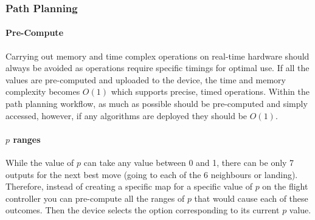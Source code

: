\subsubsection{Path Planning}\label{sub_sub_section:tgt_search}
%

\begin{comment}
\paragraph{Exhaustive Search}
The simplest algorithm is the recursive function shown in Algorithm \ref{alg:search}. There are steps taken to increase the efficiency, including pruning lines that already exceed the minimum cost as the cost is monotonic increasing and automatically terminating lines when they can land safely. However, the worst case time complexity remains $O(|V|6^{depth})$ as each node has 6 neighbours that get called recursively. To get guaranteed correct results it would require searching all paths as long as $|V|$ as costs cannot fall below 0 so it is never advantageous to revisit a node. Therefore, the worst case complexity for guaranteed optimal paths is $O(|V|6^{|V|})$. This is not usable for practical applications, therefore it requires a compromise to depth of search, no longer getting optimal path results.
\end{comment}
\paragraph{Pre-Compute}
Carrying out memory and time complex operations on real-time hardware should always be avoided as operations require specific timings for optimal use. If all the values are pre-computed and uploaded to the device, the time and memory complexity becomes $O(1)$ which supports precise, timed operations. Within the path planning workflow, as much as possible should be pre-computed and simply accessed, however, if any algorithms are deployed they should be $O(1)$.
\paragraph{$p$ ranges}
While the value of $p$ can take any value between 0 and 1, there can be only 7 outputs for the next best move (going to each of the 6 neighbours or landing). Therefore, instead of creating a specific map for a specific value of $p$ on the flight controller you can pre-compute all the ranges of $p$ that would cause each of these outcomes. Then the device selects the option corresponding to its current $p$ value.

